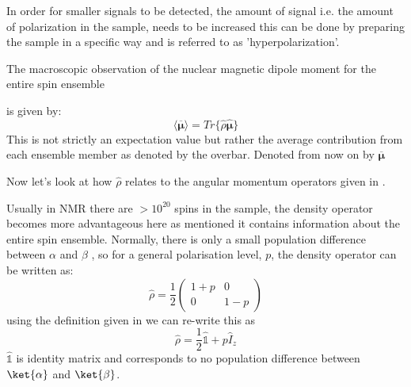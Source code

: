 In order for smaller signals to be detected, the amount of signal i.e. the amount of polarization in the sample,
needs to be increased this can be done by preparing the sample in a specific way and is referred to as
'hyperpolarization'.

\renewcommand\listoffigures{
\btypeout{List of Figures}
\begin{spacing}{1}{
    \setlength{\parskip}{1pt}
    \if@twocolumn
      \@restonecoltrue\onecolumn
    \else
      \@restonecolfalse
    \fi
    \chapter*{\listfigurename
      \@mkboth{\MakeUppercase\listfigurename}
              {\MakeUppercase\listfigurename}}
    \@starttoc{lof}
    \if@restonecol\twocolumn\fi
    \cleardoublepage
}\end{spacing}
}
\renewcommand\listoftables{
\btypeout{List of Tables}
\begin{spacing}{1}{
    \setlength{\parskip}{1pt}
    \if@twocolumn
      \@restonecoltrue\onecolumn
    \else
      \@restonecolfalse
    \fi
    \chapter*{\listtablename
      \@mkboth{
          \MakeUppercase\listtablename}{\MakeUppercase\listtablename}}
    \@starttoc{lot}
    \if@restonecol\twocolumn\fi
    \cleardoublepage
}\end{spacing}
}


The macroscopic observation of the nuclear magnetic dipole moment for the entire spin ensemble


is given by:
\begin{equation}
  \langle\overbar{\boldsymbol{\mu}}\rangle = Tr\{\hat{\rho}\hat{\boldsymbol{\mu}}\}
\end{equation}
This is not strictly an expectation value but rather the average contribution from each
ensemble member as denoted by the overbar. Denoted from now on by $\overbar{\boldsymbol{\mu}}$

Now let's look at how $\hat\rho$ relates to the angular momentum operators given in .

Usually in NMR there are $>10^{20}$ spins in the sample, the density operator becomes more advantageous here
as mentioned it contains information about the entire spin ensemble. Normally, there is only a small population difference between $\alpha$ and $\beta$ ,
so for a general polarisation level, $p$, the density operator can be written as:
\begin{equation}
  \hat\rho = \frac{1}{2}\begin{pmatrix}
    1 + p & 0\\
    0 & 1 - p
\end{pmatrix}
\end{equation}
using the definition given in  we can re-write this as
\begin{equation}
  \hat\rho = \frac{1}{2}\hat{\mathbb{1}} + p\hat{I}_z
\end{equation}
$\hat{\mathbb{1}}$ is identity matrix and corresponds to no population difference between $\ket{\alpha}$ and $\ket{\beta}$.

